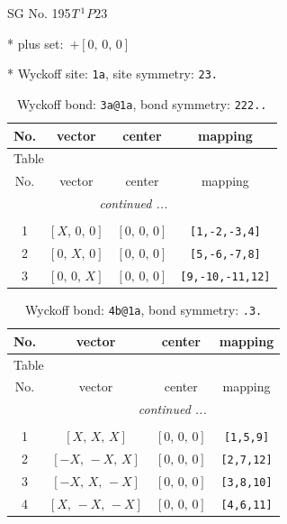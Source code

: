 \documentclass[fleqn,8pt]{jsarticle}
\begin{document}
\setcounter{MaxMatrixCols}{32}

\renewcommand{\tablename}{Table~}
\renewcommand{\figurename}{Figure~}
\begin{center}
\LARGE
SG No. 195\quad$T_{\rm }^{1}$\quad$P23$\quad[ cubic ]
\end{center}

* plus set:\,\,\,$+\left[ 0,\, 0,\, 0 \right]$


* Wyckoff site: {\tt 1a}, site symmetry: {\tt 23.}
\renewcommand{\arraystretch}{1.2}
\begin{longtable}{cccc}
\caption{Wyckoff bond: {\tt 3a@1a}, bond symmetry: {\tt 222..}}
 \\
 \hline \hline
No. & vector & center & mapping \\ \hline \endfirsthead

\multicolumn{3}{l}{\tablename\ \thetable{}} \\
 \hline \hline
No. & vector & center & mapping \\ \hline \endhead

 \hline \hline
\multicolumn{3}{r}{\footnotesize\it continued ...} \\ \endfoot

 \hline \hline
\multicolumn{3}{r}{} \\ \endlastfoot

1 & $\left[ X,\, 0,\, 0 \right]$ & $\left[ 0,\, 0,\, 0 \right]$ & {\tt [1,-2,-3,4]} \\ \hline
2 & $\left[ 0,\, X,\, 0 \right]$ & $\left[ 0,\, 0,\, 0 \right]$ & {\tt [5,-6,-7,8]} \\ \hline
3 & $\left[ 0,\, 0,\, X \right]$ & $\left[ 0,\, 0,\, 0 \right]$ & {\tt [9,-10,-11,12]} \\
\end{longtable}
\renewcommand{\arraystretch}{1.2}
\begin{longtable}{cccc}
\caption{Wyckoff bond: {\tt 4b@1a}, bond symmetry: {\tt .3.}}
 \\
 \hline \hline
No. & vector & center & mapping \\ \hline \endfirsthead

\multicolumn{3}{l}{\tablename\ \thetable{}} \\
 \hline \hline
No. & vector & center & mapping \\ \hline \endhead

 \hline \hline
\multicolumn{3}{r}{\footnotesize\it continued ...} \\ \endfoot

 \hline \hline
\multicolumn{3}{r}{} \\ \endlastfoot

1 & $\left[ X,\, X,\, X \right]$ & $\left[ 0,\, 0,\, 0 \right]$ & {\tt [1,5,9]} \\ \hline
2 & $\left[ - X,\, - X,\, X \right]$ & $\left[ 0,\, 0,\, 0 \right]$ & {\tt [2,7,12]} \\ \hline
3 & $\left[ - X,\, X,\, - X \right]$ & $\left[ 0,\, 0,\, 0 \right]$ & {\tt [3,8,10]} \\ \hline
4 & $\left[ X,\, - X,\, - X \right]$ & $\left[ 0,\, 0,\, 0 \right]$ & {\tt [4,6,11]} \\
\end{longtable}
\end{document}
